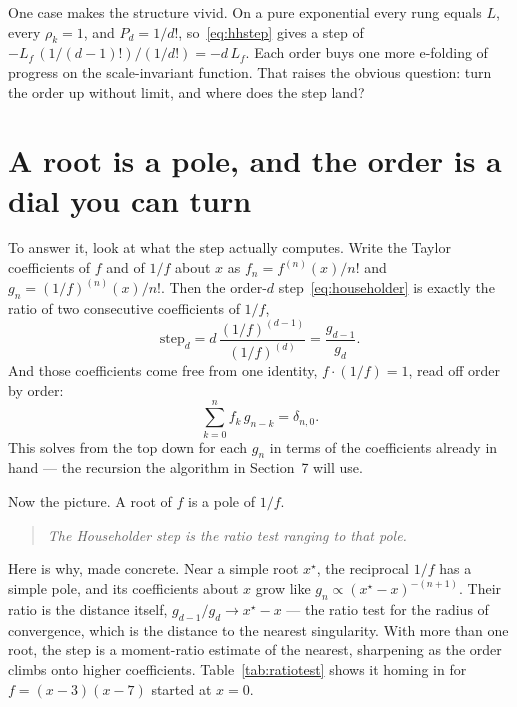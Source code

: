 \documentclass[11pt]{article}
\newcommand{\Lf}{L_{f}}                 %
\newcommand{\rr}{\rho}                  %
\newcommand{\order}{d}                  %
\begin{document}
One case makes the structure vivid. On a pure exponential every rung equals $L$,
every $\rr_k=1$, and $P_\order=1/\order!$, so~\eqref{eq:hhstep} gives a step of
$-\Lf\,(1/(\order-1)!)\big/(1/\order!)=-\order\,\Lf$. Each order buys one more
e-folding of progress on the scale-invariant function. That raises the obvious
question: turn the order up without limit, and where does the step land?

\section{A root is a pole, and the order is a dial you can turn}

To answer it, look at what the step actually computes. Write the Taylor coefficients
of $f$ and of $1/f$ about $x$ as $f_n=f^{(n)}(x)/n!$ and $g_n=(1/f)^{(n)}(x)/n!$. Then
the order-$\order$ step~\eqref{eq:householder} is exactly the ratio of two consecutive
coefficients of $1/f$,
\begin{equation}
  \mathrm{step}_\order
   = \order\,\frac{(1/f)^{(\order-1)}}{(1/f)^{(\order)}}
   = \frac{g_{\order-1}}{g_\order}.
  \label{eq:ratiostep}
\end{equation}
And those coefficients come free from one identity, $f\cdot(1/f)=1$, read off order by
order:
\begin{equation}
  \sum_{k=0}^{n} f_k\,g_{n-k} = \delta_{n,0}.
  \label{eq:convorth}
\end{equation}
This solves from the top down for each $g_n$ in terms of the coefficients already in
hand --- the recursion the algorithm in Section~7 will use.

Now the picture. A root of $f$ is a pole of $1/f$.

\begin{quote}\itshape
The Householder step is the ratio test ranging to that pole.
\end{quote}

Here is why, made concrete. Near a simple root $x^\star$, the reciprocal $1/f$ has a
simple pole, and its coefficients about $x$ grow like
$g_n\propto(x^\star-x)^{-(n+1)}$. Their ratio is the distance itself,
$g_{\order-1}/g_\order\to x^\star-x$ --- the ratio test for the radius of
convergence, which is the distance to the nearest singularity. With more than one
root, the step is a moment-ratio estimate of the nearest, sharpening as the order
climbs onto higher coefficients. Table~\ref{tab:ratiotest} shows it homing in for
$f=(x-3)(x-7)$ started at $x=0$.
\end{document}
